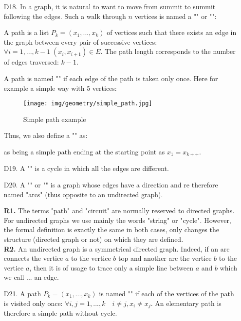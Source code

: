 {\begin{enumerate}
	\item[D18.] In a graph, it is natural to want to move from summit to summit following the edges. Such a walk through $n$ vertices is named a ""  or "":
	
	A path is a list $P_k=(x_1,...,x_k)$ of vertices such that there exists an edge in the graph between every pair of successive vertices: $\forall i=1,...,k-1\; (x_i,x_{i+1})\in E$. The path length corresponds to the number of edges traversed: $k-1$.
	
	A path is named "" if each edge of the path is taken only once. Here for example a simple way with $5$ vertices:
	\begin{figure}[H]
		\centering
		\texttt{[image: img/geometry/simple\_path.jpg]}
		\caption{Simple path example}
	\end{figure}
	Thus, we also define a "" as:
	
	as being a simple path ending at the starting point as $x_1=x_{k++}$. 
	
	\item[D19.] A "" is a cycle in which all the edges are different.
	
	\item[D20.] A "" or "\label{oriented graph}" is a graph whose edges have a direction and re therefore named "arcs" (thus opposite to an undirected graph).
	
	\begin{tcolorbox}[title=Remarks,colframe=black,arc=10pt]
	\textbf{R1.} The terms "path" and "circuit" are normally reserved to directed graphs. For undirected graphs we use mainly the words "string" or "cycle". However, the formal definition is exactly the same in both cases, only changes the structure (directed graph or not) on which they are defined.\\
	
	\textbf{R2.} An undirected graph is a symmetrical directed graph. Indeed, if an arc connects the vertice $a$ to the vertice $b$ top and another arc the vertice $b$ to the vertice $a$, then it is of usage to trace only a simple line between $a$ and $b$ which we call ... an edge.
	\end{tcolorbox}
	
	 \item[D21.] A path $P_k=(x_1,...,x_k)$ is named "" if each of the vertices of the path is visited only once: $\forall i,j=1,...,k \quad i\neq j,x_i \neq x_j$. An elementary path is therefore a simple path without cycle.
	 

\end{enumerate}}
